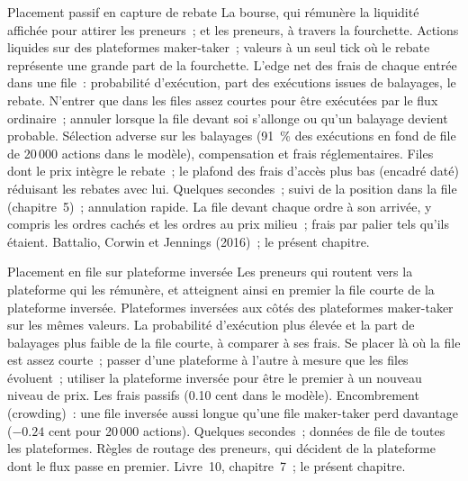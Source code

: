 \begin{strategyfile}{Placement passif en capture de rebate}\label{strat:hf:rebates-inverted-venues-and-tiers:capture}
 La bourse, qui rémunère la liquidité affichée pour attirer les preneurs~; et les preneurs, à travers la fourchette.
 Actions liquides sur des plateformes maker-taker~; valeurs à un seul tick où le rebate représente une grande part de la fourchette.
 L'edge net des frais de chaque entrée dans une file~: probabilité d'exécution, part des exécutions issues de balayages, le rebate.
 N'entrer que dans les files assez courtes pour être exécutées par le flux ordinaire~; annuler lorsque la file devant soi s'allonge ou qu'un balayage devient probable.
 Sélection adverse sur les balayages (91~\% des exécutions en fond de file de 20\,000 actions dans le modèle), compensation et frais réglementaires.
 Files dont le prix intègre le rebate~; le plafond des frais d'accès plus bas (encadré daté) réduisant les rebates avec lui.
 Quelques secondes~; suivi de la position dans la file (chapitre~5)~; annulation rapide.
 La file devant chaque ordre à son arrivée, y compris les ordres cachés et les ordres au prix milieu~; frais par palier tels qu'ils étaient.
 Battalio, Corwin et Jennings (2016)~; le présent chapitre.
\end{strategyfile}

\begin{strategyfile}{Placement en file sur plateforme inversée}\label{strat:hf:rebates-inverted-venues-and-tiers:inverted}
 Les preneurs qui routent vers la plateforme qui les rémunère, et atteignent ainsi en premier la file courte de la plateforme inversée.
 Plateformes inversées aux côtés des plateformes maker-taker sur les mêmes valeurs.
 La probabilité d'exécution plus élevée et la part de balayages plus faible de la file courte, à comparer à ses frais.
 Se placer là où la file est assez courte~; passer d'une plateforme à l'autre à mesure que les files évoluent~; utiliser la plateforme inversée pour être le premier à un nouveau
niveau de prix.
 Les frais passifs (0.10 cent dans le modèle).
 Encombrement (crowding)~: une file inversée aussi longue qu'une file maker-taker perd davantage ($-0.24$ cent pour 20\,000 actions).
 Quelques secondes~; données de file de toutes les plateformes.
 Règles de routage des preneurs, qui décident de la plateforme dont le flux passe en premier.
 Livre~10, chapitre~7~; le présent chapitre.
\end{strategyfile}

